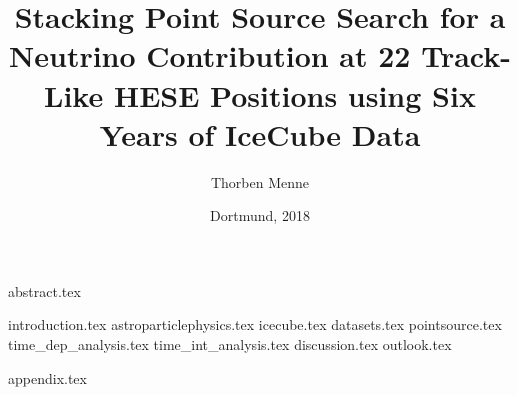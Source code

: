 

\usepackage{aas_macros}

\author{Thorben Menne}
\title{Stacking Point Source Search for a Neutrino Contribution at 22 Track-Like HESE Positions using Six Years of IceCube Data}
\date{Dortmund, 2018}

\titlehead{\texttt{[image: inc/tu-logo\_bw.pdf]}}






\frontmatter
\maketitle
\makecorrectorpage
{abstract.tex}

\tableofcontents

\mainmatter
{introduction.tex}
{astroparticlephysics.tex}
{icecube.tex}
{datasets.tex}
{pointsource.tex}
{time_dep_analysis.tex}
{time_int_analysis.tex}
{discussion.tex}
{outlook.tex}

\appendix
{appendix.tex}

\backmatter
\printbibliography

\renewcommand{\listfigurename}{List of figures}
\renewcommand{\listtablename}{List of tables}

\cleardoublepage
\listoffigures

\cleardoublepage
\listoftables



